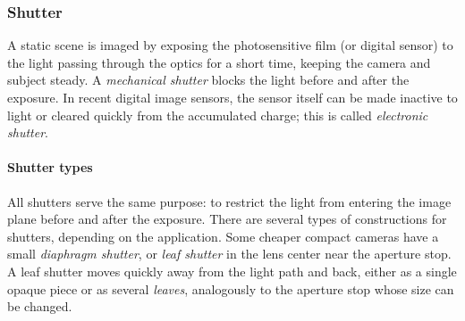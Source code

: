 


\subsubsection{Shutter} %


A static scene is imaged by exposing the photosensitive film (or digital sensor) to the light passing through the optics for a short time, keeping the camera and subject steady.
A \emph{mechanical shutter} blocks the light before and after the exposure.
\cite{greenleaf1950photographic}
In recent digital image sensors, the sensor itself can be made inactive to light or cleared quickly from the accumulated charge; this is called \emph{electronic shutter}.
\cite{caspeelectronic,kodakshutter}





\paragraph{Shutter types}
All shutters serve the same purpose: to restrict the light from entering the image plane before and after the exposure.
There are several types of constructions for shutters, depending on the application.
Some cheaper compact cameras have a small \emph{diaphragm shutter}, or \emph{leaf shutter} in the lens center near the aperture stop.
A leaf shutter moves quickly away from the light path and back, either as a single opaque piece or as several \emph{leaves}, analogously to the aperture stop whose size can be changed.
\cite{greenleaf1950photographic}

